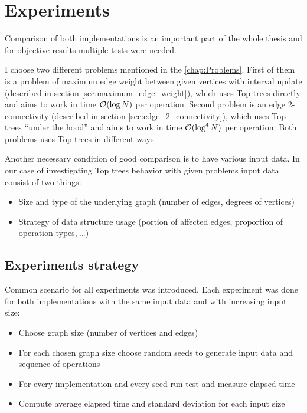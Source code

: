 \chapter{Experiments}
\label{chap:Experiments}

Comparison of both implementations is an important part of the whole thesis
and for objective results multiple tests were needed.

I choose two different problems mentioned in the \cref{chap:Problems}.
First of them is a problem of maximum edge weight between given vertices with
interval update (described in section \ref{sec:maximum_edge_weight}), which uses
Top trees directly and aims to work in time ${\cal O}(\log N)$ per operation. Second
problem is an edge 2-connectivity (described in section \ref{sec:edge_2_connectivity}),
which uses Top trees ``under the hood'' and aims to work in time ${\cal O}(\log^4 N)$
per operation. Both problems uses Top trees in different ways.

Another necessary condition of good comparison is to have various input data. In
our case of investigating Top trees behavior with given problems input data
consist of two things:
\begin{itemize}
\item Size and type of the underlying graph (number of edges, degrees of vertices)
\item Strategy of data structure usage (portion of affected edges, proportion of
operation types, \dots)
\end{itemize}

\section{Experiments strategy}

Common scenario for all experiments was introduced. Each experiment was done
for both implementations with the same input data and with increasing input
size:

\begin{itemize}
\item Choose graph size (number of vertices and edges)
\item For each chosen graph size choose random seeds to generate input data and
sequence of operations
\item For every implementation and every seed run test and measure elapsed time
\item Compute average elapsed time and standard deviation for each input size
\end{itemize}


